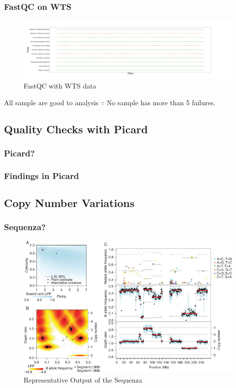 \documentclass{beamer}
\begin{document}
    \begin{frame}
        \frametitle{FastQC on WTS}

        \begin{figure}
            \includegraphics[width=\linewidth]{figures/FastQC/FastQC_WTS.pdf}
            \caption{FastQC with WTS data}
        \end{figure}

        \begin{exampleblock}{All sample are good to analysis}
            $\because$ No sample has more than 5 failures.
        \end{exampleblock}
    \end{frame}

    \subsection{Quality Checks with Picard}
    \begin{frame}
        \frametitle{Picard?}
    \end{frame}

    \begin{frame}
        \frametitle{Findings in Picard}
    \end{frame}

    \subsection{Copy Number Variations}
    \begin{frame}
        \frametitle{Sequenza?}

        \begin{figure}
            \includegraphics[width=0.6 \linewidth]{figures/Workflow/sequenza.jpg}
            \caption{Representative Output of the Sequenza \protect\cite{sequenza1}}
        \end{figure}
    \end{frame}
\end{document}
